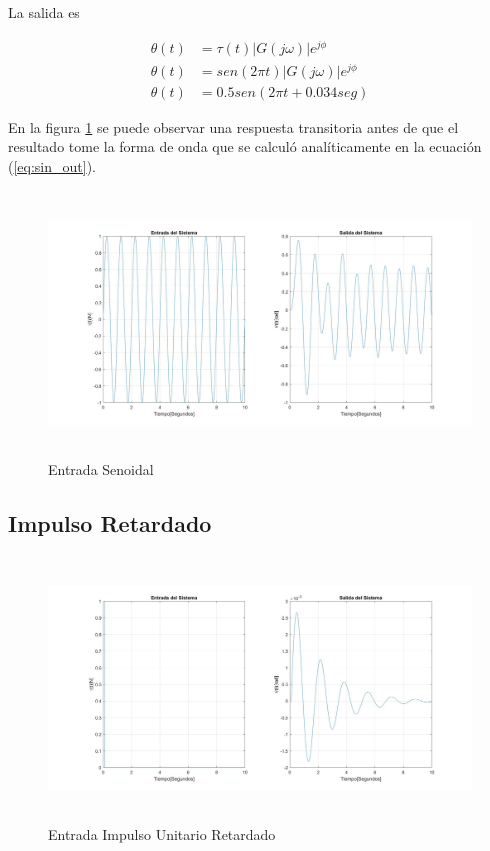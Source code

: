 \documentclass[12pt]{article}
\begin{document}
La salida es

\begin{equation}
    \begin{split}
        \theta(t)&=\tau(t)|G(j\omega)|e^{j\phi}\\
        \theta(t)&=sen(2\pi t)|G(j\omega)|e^{j\phi}\\
        \theta(t)&=0.5sen(2\pi t+0.034seg)
    \end{split}
    \label{eq:sin_out}
\end{equation}

En la figura \ref{fig:sin} se puede observar una respuesta transitoria antes de que el resultado tome la forma de onda que se calculó analíticamente en la ecuación (\ref{eq:sin_out}).

\begin{figure}[h]
    \centering
    \includegraphics[width=17cm, height=7cm]{sin.jpg}
    \caption{Entrada Senoidal}
    \label{fig:sin}
\end{figure}

\newpage

\subsection{Impulso Retardado}
\vspace{6mm}
\begin{figure}[h]
    \centering
    \includegraphics[width=17cm, height=7cm]{impulso.jpg}
    \caption{Entrada Impulso Unitario Retardado}
    \label{fig:step}
\end{figure}
\end{document}
